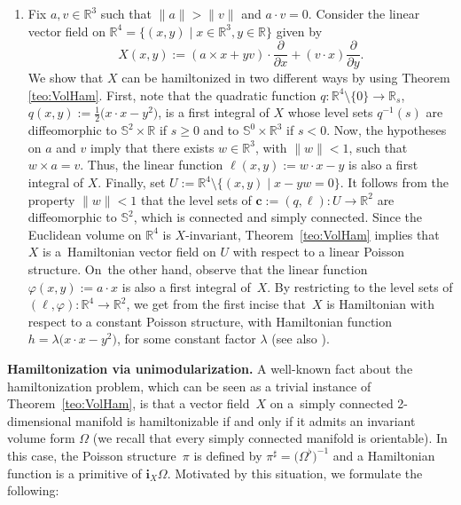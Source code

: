 \documentclass[10pt,a4paper]{amsart}
\newcommand{\R}[1]{\mathbb{R}^{#1}}
\newcommand{\ii}{\mathbf{i}}
\numberwithin{equation}{section}
\begin{document}
\begin{Example}
\begin{enumerate}
 \item Fix $a,v \in \R{3}$ such that $\|a\| > \|v\|$ and $a \cdot v=0$. Consider the linear vector field on $\R{4}=\big\{(x,y) \mid x \in \R{3}, y \in \mathbb{R}\big\}$ given by
 \begin{equation*}
 X(x,y) := (a \times x + yv)\cdot\frac{\partial}{\partial x}+(v\cdot x)\frac{\partial}{\partial y}.
 \end{equation*}
 We show that $X$ can be hamiltonized in two different ways by using Theorem \ref{teo:VolHam}. First, note that the quadratic function $q\colon \R{4} \setminus \{0\} \to \mathbb{R}_{s}$, $q(x,y) := \tfrac{1}{2}\big(x\cdot x - y^2\big)$, is a first integral of $X$ whose level sets $q^{-1}(s)$ are diffeomorphic to $\mathbb{S}^2 \times \mathbb{R}$ if $s \geq 0$ and to $\mathbb{S}^{0} \times \R{3}$ if $s < 0$. Now, the hypotheses on $a$ and $v$ imply that there exists $w \in \R{3}$, with $\|w\| < 1$, such that $w \times a = v$. Thus, the linear function $\ell(x,y) := w \cdot x - y$ is also a first integral of $X$. Finally, set $U:=\R{4} \setminus \{(x,y) \mid x - yw = 0 \}$. It follows from the property $\|w\| < 1$ that the level sets of $\boldsymbol{c}:=(q,\ell)\colon U \to \R{2}$ are diffeomorphic to $\mathbb{S}^2$, which is connected and simply connected. Since the Euclidean volume on $\R{4}$ is $X$-invariant, Theorem~\ref{teo:VolHam} implies that~$X$ is a~Hamiltonian vector field on $U$ with respect to a linear Poisson structure. On~the other hand, observe that the linear function $\varphi(x,y) := a\cdot x$ is also a first integral of~$X$. By restricting to the level sets of $(\ell,\varphi)\colon \R{4} \to \R{2}$, we get from the first incise that~$X$ is Hamiltonian with respect to a constant Poisson structure, with Hamiltonian function $h = \lambda\big(x\cdot x-y^2\big)$, for some constant factor $\lambda$ (see also \cite[Theorem 2]{Kozlov-92}).
 \end{enumerate}
\end{Example}

{\bf Hamiltonization via unimodularization.} A well-known fact about the hamiltonization problem, which can be seen as a trivial instance of Theorem~\ref{teo:VolHam}, is that a vector field~$X$ on a~simply connected 2-dimensional manifold is hamiltonizable if and only if it admits an invariant volume form $\Omega$ (we recall that every simply connected manifold is orientable). In this case, the Poisson structure~$\pi$ is defined by $\pi^{\sharp} = \big(\Omega^{\flat}\big)^{-1}$ and a Hamiltonian function is a primitive of $\ii_{X}\Omega$. Motivated by this situation, we formulate the following:
\end{document}
